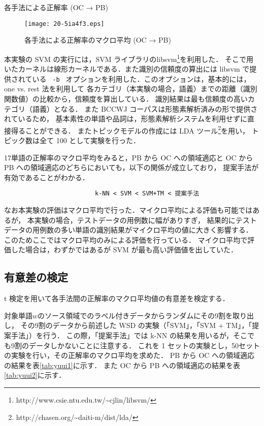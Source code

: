 \documentclass[japanese]{jnlp_1.4}
\begin{document}
\begin{table}[t]
\caption{各手法による正解率 (OC → PB)}
\label{tab:result2}

\end{table}
\begin{figure}[t]
\begin{center}
\texttt{[image: 20-5ia4f3.eps]}
\end{center}
\caption{各手法による正解率のマクロ平均 (OC → PB)}
\label{kekka2}
\end{figure} 

本実験の SVM の実行には，SVM ライブラリのlibsvm\footnote{http://www.csie.ntu.edu.tw/{\textasciitilde}cjlin/libsvm/}を利用した．
そこで用いたカーネルは線形カーネルである．また識別の信頼度の算出には libsvm で提供されている
\verb| -b |
オプションを利用した．このオプションは，基本的には，one vs. rest 法を利用して
各カテゴリ（本実験の場合，語義）までの距離（識別関数値）の比較から，信頼度を算出している．
識別結果は最も信頼度の高いカテゴリ（語義）となる．
また BCCWJ コーパスは形態素解析済みの形で提供されているため，
基本素性の単語や品詞は，形態素解析システムを利用せずに直接得ることができる．
またトピックモデルの作成には LDA ツール\footnote{http://chasen.org/{\textasciitilde}daiti-m/dist/lda/}を用い，
トピック数は全て 100 として実験を行った．

17単語の正解率のマクロ平均をみると，PB から OC への領域適応と
OC から PB への領域適応のどちらにおいても，以下の関係が成立しており，
提案手法が有効であることがわかる．

\vspace{0.5\Cvs}
\begin{verbatim}
                         k-NN < SVM < SVM+TM < 提案手法
\end{verbatim}
\vspace{0.5\Cvs}

なお本実験の評価はマクロ平均で行った．マイクロ平均による評価も可能ではあるが，
本実験の場合，テストデータの用例数に幅がありすぎ，
結果的にテストデータの用例数の多い単語の識別結果がマイクロ平均の値に大きく影響する．
このためここではマクロ平均のみによる評価を行っている．
マイクロ平均で評価した場合は，わずかではあるが SVM が最も高い評価値を出していた．


\subsection{有意差の検定}

t 検定を用いて各手法間の正解率のマクロ平均値の有意差を検定する．

対象単語\( w \)のソース領域でのラベル付きデータからランダムにその9割を取り出し，
その9割のデータから前述した WSD の実験（「SVM」，「SVM + TM」，「提案手法」）を行う．
この際，「提案手法」では k-NN の結果を用いるが，そこでも9割のデータしかないことに注意する．
これを 1 セットの実験とし，50セットの実験を行い，その正解率のマクロ平均を求めた．
PB から OC への領域適応の結果を\mbox{表\ref{tab:yuui1}}に示す．
また OC から PB への領域適応の結果を\mbox{表\ref{tab:yuui2}}に示す．
\end{document}
